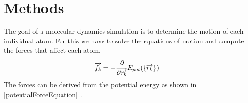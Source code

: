 \chapter{Methods}
\begin{comment}
	0. Verlet Step
	1. Describe the Lenard Jones Potential
	2. Describe the Berendsen Thermostat
	3. Describe the Gupta 
	
\end{comment}
\begin{comment}
	Atoms are discreticed into the Postitions, Velocities and Forces 
	Second propagate the atom in the discriticed realm given constant Forces
		-> Velocity-Verlet Integration
	
	Compute Forces somehow
	-> Potentials
	LJ Potential 
	Gupta Potential
	
	Thermodynamic Effects
	Berendsen Thermostat
		->Gentle Way of resealing the Velocities
		
\end{comment}
\begin{comment}
goals of a md simulation
- determine the motion of each atom
	-> solve equation of motion 
	-> compute forces
	-> From the dirivation of the potential energy we can get the forces

- disciticed in time

\end{comment}
The goal of a molecular dynamics simulation is to determine the motion of each individual atom. For this we have to solve the equations of motion and compute the forces that affect each atom.
\begin{equation}
	\label{potentialForceEquation}
	\overrightarrow{f_{k}} = -\cfrac{\displaystyle\partial}{\displaystyle \partial \overrightarrow{r_{k}}} E_{pot}(\{\overrightarrow{r_{k}}\}) 
\end{equation}
The forces can be derived from the potential energy as shown in \ref{potentialForceEquation} \cite[cf.][]{molDymCourse}. 


